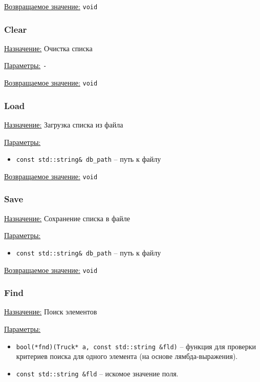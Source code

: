 \underline{Возвращаемое значение:} \verb|void|


\subsubsection*{Clear}

\underline{Назначение:} Очистка списка

\underline{Параметры:} \verb|-|

\underline{Возвращаемое значение:} \verb|void|


\subsubsection*{Load}

\underline{Назначение:} Загрузка списка из файла

\underline{Параметры:} 

\begin{itemize}
    \item \verb|const std::string& db_path| -- путь к файлу
\end{itemize}

\underline{Возвращаемое значение:} \verb|void|


\subsubsection*{Save}

\underline{Назначение:} Сохранение списка в файле

\underline{Параметры:} 

\begin{itemize}
    \item \verb|const std::string& db_path| -- путь к файлу
\end{itemize}

\underline{Возвращаемое значение:} \verb|void|


\subsubsection*{Find}

\underline{Назначение:} Поиск элементов

\underline{Параметры:} 

\begin{itemize}
    \item \verb|bool(*fnd)(Truck* a, const std::string &fld)| -- функция для проверки критериев поиска для одного элемента (на основе лямбда-выражения).
    \item \verb|const std::string &fld| -- искомое значение поля.
\end{itemize}

